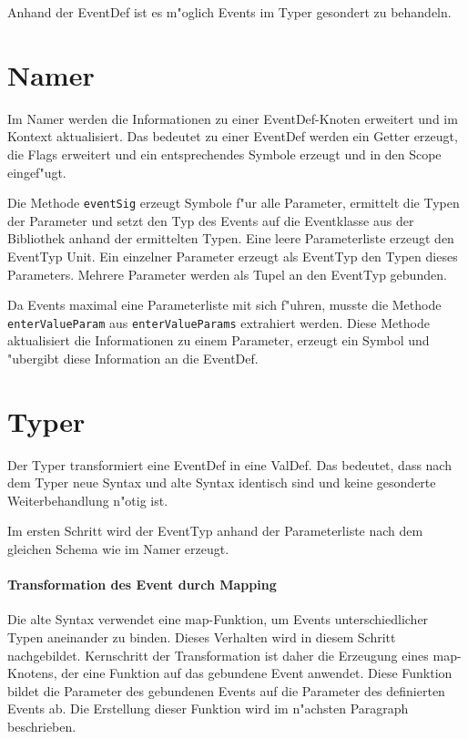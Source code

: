 \documentclass[a4paper,11pt,parskip=half]{scrartcl}
\begin{document}
Anhand der EventDef ist es m"oglich Events im Typer gesondert zu behandeln.

\section{Namer}

Im Namer werden die Informationen zu einer EventDef-Knoten erweitert und im Kontext aktualisiert.
Das bedeutet zu einer EventDef werden ein Getter erzeugt, die Flags erweitert und ein entsprechendes Symbole erzeugt und in den Scope eingef"ugt.

Die Methode \texttt{eventSig} erzeugt Symbole f"ur alle Parameter, ermittelt die Typen der Parameter und setzt den Typ des Events auf die Eventklasse aus der Bibliothek anhand der ermittelten Typen.
Eine leere Parameterliste erzeugt den EventTyp Unit.
Ein einzelner Parameter erzeugt als EventTyp den Typen dieses Parameters.
Mehrere Parameter werden als Tupel an den EventTyp gebunden.

Da Events maximal eine Parameterliste mit sich f"uhren, musste die Methode \texttt{enterValueParam} aus \texttt{enterValueParams} extrahiert werden.
Diese Methode aktualisiert die Informationen zu einem Parameter, erzeugt ein Symbol und "ubergibt diese Information an die EventDef.

\section{Typer}

Der Typer transformiert eine EventDef in eine ValDef.
Das bedeutet, dass nach dem Typer neue Syntax und alte Syntax identisch sind und keine gesonderte Weiterbehandlung n"otig ist.

Im ersten Schritt wird der EventTyp anhand der Parameterliste nach dem gleichen Schema wie im Namer erzeugt.

\paragraph{Transformation des Event durch Mapping}
Die alte Syntax verwendet eine map-Funktion, um Events unterschiedlicher Typen aneinander zu binden.
Dieses Verhalten wird in diesem Schritt nachgebildet.
Kernschritt der Transformation ist daher die Erzeugung eines map-Knotens, der eine Funktion auf das gebundene Event anwendet. 
Diese Funktion bildet die Parameter des gebundenen Events auf die Parameter des definierten Events ab.
Die Erstellung dieser Funktion wird im n"achsten Paragraph beschrieben.
\end{document}
